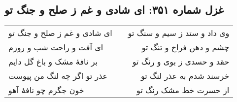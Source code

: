 \begin{center}
\section*{غزل شماره ۳۵۱: ای شادی و غم ز صلح و جنگ تو}
\label{sec:351}
\begin{longtable}{l p{0.5cm} r}
ای شادی و غم ز صلح و جنگ تو
&&
وی داد و ستد ز سیم و سنگ تو
\\
ای آفت و راحت شب و روزم
&&
چشم و دهن فراخ و تنگ تو
\\
بر نافهٔ مشک و باغ گل دایم
&&
حقد و حسدی ز بوی و رنگ تو
\\
عذر تو اگر چه لنگ من پیوست
&&
خرسند شدم به عذر لنگ تو
\\
خون جگرم چو نافهٔ آهو
&&
از حسرت خط مشک رنگ تو
\\
\end{longtable}
\end{center}
